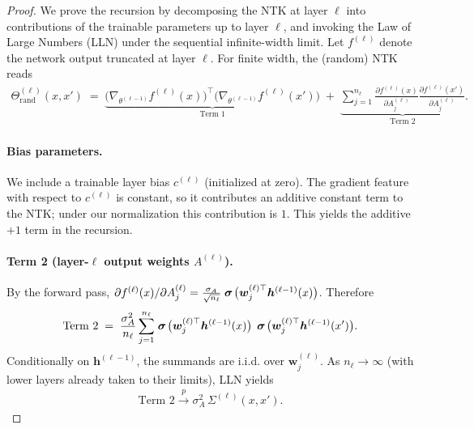 \begin{proof}
\label{proof:ntk_recursion}
We prove the recursion by decomposing the NTK at layer \( \ell \) into contributions of the trainable parameters up to layer \( \ell \), and invoking the Law of Large Numbers (LLN) under the sequential infinite-width limit. Let \( f^{(\ell)} \) denote the network output truncated at layer \( \ell \). For finite width, the (random) NTK reads
\begin{align}
\Theta^{(\ell)}_{\mathrm{rand}}(x,x') \;=\; \underbrace{\big(\nabla_{\theta^{(\ell-1)}} f^{(\ell)}(x)\big)^\top \big(\nabla_{\theta^{(\ell-1)}} f^{(\ell)}(x')\big)}_{\text{Term 1}} \;+\; \underbrace{\sum_{j=1}^{n_\ell}\frac{\partial f^{(\ell)}(x)}{\partial A^{(\ell)}_j}\frac{\partial f^{(\ell)}(x')}{\partial A^{(\ell)}_j}}_{\text{Term 2}}.
\end{align}

\paragraph{Bias parameters.}
We include a trainable layer bias \(c^{(\ell)}\) (initialized at zero). The gradient feature with respect to \(c^{(\ell)}\) is constant, so it contributes an additive constant term to the NTK; under our normalization this contribution is \(1\). This yields the additive \(+1\) term in the recursion.

\paragraph{Term 2 (layer-\(\ell\) output weights \(A^{(\ell)}\)).}
By the forward pass, \(\partial f^{(\ell)}(x)/\partial A^{(\ell)}_j = \frac{\sigma_A}{\sqrt{n_\ell}}\mathrel{\boldsymbol{\sigma}}\!\big(\bm{w}^{(\ell)\top}_j\bm{h}^{(\ell-1)}(x)\big)\). Therefore
\begin{align}
\text{Term 2} \;=\; \frac{\sigma_A^2}{n_\ell}\sum_{j=1}^{n_\ell} \mathrel{\boldsymbol{\sigma}}\!\big(\bm{w}^{(\ell)\top}_j\bm{h}^{(\ell-1)}(x)\big)\,\mathrel{\boldsymbol{\sigma}}\!\big(\bm{w}^{(\ell)\top}_j\bm{h}^{(\ell-1)}(x')\big).
\end{align}
Conditionally on \(\bm{h}^{(\ell-1)}\), the summands are i.i.d. over \(\bm{w}^{(\ell)}_j\). As \(n_\ell\to\infty\) (with lower layers already taken to their limits), LLN yields
\begin{align}
\text{Term 2} \xrightarrow{p} \sigma_A^2\,\Sigma^{(\ell)}(x,x').
\end{align}


\end{proof}
